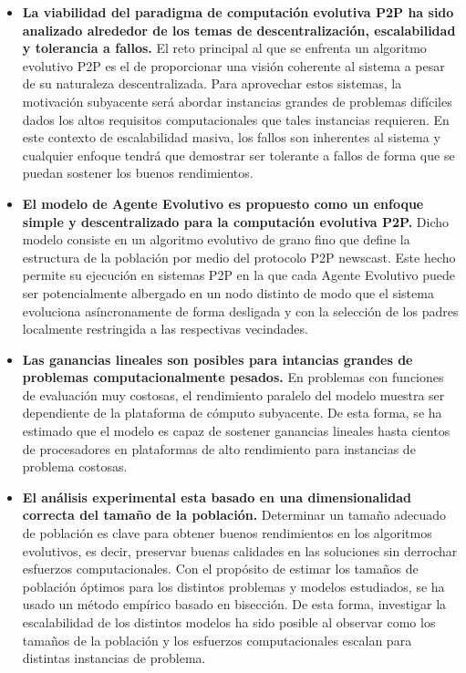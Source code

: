\begin{itemize}

\item[] {\bf La viabilidad del paradigma de computaci\'on evolutiva P2P ha sido analizado alrededor de los temas de descentralizaci\'on, escalabilidad y tolerancia a fallos.} El reto principal al que se enfrenta un algoritmo evolutivo P2P es el de proporcionar una visi\'on coherente al sistema a pesar de su naturaleza descentralizada. Para aprovechar estos sistemas, la motivaci\'on subyacente ser\'a abordar instancias grandes de problemas dif\'iciles dados los altos requisitos computacionales que tales instancias requieren. En este contexto de escalabilidad masiva, los fallos son inherentes al sistema y cualquier enfoque tendr\'a que demostrar ser tolerante a fallos de forma que se puedan sostener los buenos rendimientos.



\item[] {\bf El modelo de Agente Evolutivo es propuesto como un enfoque simple y descentralizado para la computaci\'on evolutiva P2P.} Dicho modelo consiste en un algoritmo evolutivo de grano fino que define la estructura de la poblaci\'on  por medio del protocolo P2P newscast. Este hecho permite su ejecuci\'on en sistemas P2P en la que cada Agente Evolutivo puede ser potencialmente albergado en un nodo distinto de modo que el sistema evoluciona as\'incronamente de forma desligada y con la selecci\'on de los padres localmente restringida a las respectivas vecindades. 


\item[] {\bf Las ganancias lineales son posibles para intancias grandes de problemas computacionalmente pesados.}
En problemas con funciones de evaluaci\'on muy costosas, el rendimiento paralelo del modelo muestra ser dependiente de la plataforma de c\'omputo subyacente. De esta forma, se ha estimado que el modelo es capaz de sostener ganancias lineales hasta cientos de procesadores en plataformas de alto rendimiento para instancias de problema costosas. 

 
\item[] {\bf El an\'alisis experimental esta basado en una dimensionalidad correcta del tama\~no de la poblaci\'on.}
Determinar un tama\~no adecuado de poblaci\'on es clave para obtener buenos rendimientos en los algoritmos evolutivos, es decir, preservar buenas calidades en las soluciones sin derrochar esfuerzos computacionales. Con el prop\'osito de estimar los tama\~nos de poblaci\'on \'optimos para los distintos problemas y modelos estudiados, se ha usado un m\'etodo emp\'irico basado en bisecci\'on. De esta forma, investigar la escalabilidad de los distintos modelos ha sido posible al observar como los tama\~nos de la poblaci\'on y los esfuerzos computacionales escalan para distintas instancias de problema.


\end{itemize}
